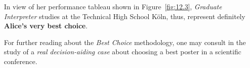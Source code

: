 In view of her performance tableau shown in Figure~\vref{fig:12.3}, \emph{Graduate Interpreter} studies at the Technical High School Köln, thus, represent definitely \textbf{Alice's very best choice}.

\vspace{\baselineskip}
For further reading about the \Rubis \emph{Best Choice} methodology, one may consult in \citet{BIS-2015bestPoster} the study of a \emph{real decision-aiding case} about choosing a best poster in a scientific conference.
 
%


